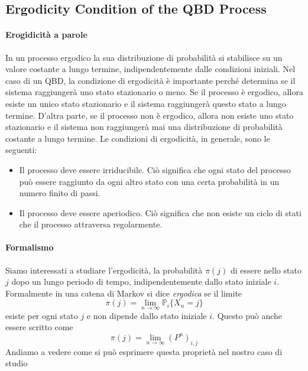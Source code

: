 \documentclass[11pt]{article}
\begin{document}
\subsection{Ergodicity Condition of the QBD Process}

\paragraph{Erogidicità a parole} In un processo ergodico la sua distribuzione di probabilità si stabilisce su un valore costante a lungo termine, indipendentemente dalle condizioni iniziali.
Nel caso di un QBD, la condizione di ergodicità è importante perché determina se il sistema raggiungerà uno stato stazionario o meno. Se il processo è ergodico, allora esiste un unico stato stazionario e il sistema raggiungerà questo stato a lungo termine. D'altra parte, se il processo non è ergodico, allora non esiste uno stato stazionario e il sistema non raggiungerà mai una distribuzione di probabilità costante a lungo termine. Le condizioni di ergodicità, in generale, sono le seguenti:
\begin{itemize}
    \item Il processo deve essere irriducibile. Ciò significa che ogni stato del processo può essere raggiunto da ogni altro stato con una certa probabilità in un numero finito di passi.
    \item Il processo deve essere aperiodico. Ciò significa che non esiste un ciclo di stati che il processo attraversa regolarmente.
\end{itemize}

\paragraph{Formalismo}  Siamo interessati a studiare l'ergodicità, la probabilità $\pi(j)$ di essere nello stato $j$ dopo un lungo periodo di tempo, indipendentemente dallo stato iniziale $i$. Formalmente in una catena di Markov si dice \emph{ergodica} se il limite
$$ \pi(j) = \lim_{n\to \infty} \mathbb{P}_i \{X_n = j\} $$
esiste per ogni stato $j$ e non dipende dallo stato iniziale $i$. Questo può anche essere scritto come
$$ \pi(j) = \lim_{n \to \infty} (P^n)_{i,j} $$
Andiamo a vedere come si può esprimere questa proprietà nel nostro caso di studio
\end{document}
